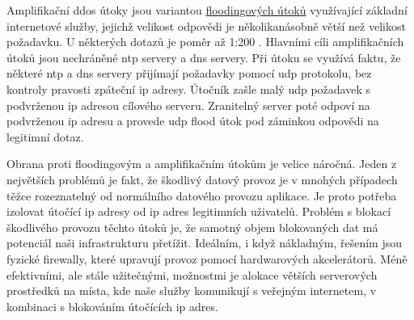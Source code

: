 
\noindent
Amplifikační \acrshort{ddos} útoky jsou variantou \hyperref[subsec:ddos-flood-attack]{floodingových útoků} využívající základní internetové služby, jejichž velikost odpovědi je několikanásobně větší než velikost požadavku. U některých dotazů je poměr až 1:200 \cite{ddos-amplify-ratio}. Hlavními cíli amplifikačních útoků jsou nechráněné \acrshort{ntp} servery\cite{ddos-amplify-ratio} a \acrshort{dns} servery\cite{dns-flood}. Při útoku se využívá faktu, že některé \acrshort{ntp} a \acrshort{dns} servery přijímají požadavky pomocí \acrshort{udp} protokolu, bez kontroly pravosti zpáteční \acrshort{ip} adresy. Útočník zašle malý \acrshort{udp} požadavek s podvrženou \acrshort{ip} adresou cílového serveru. Zranitelný server poté odpoví na podvrženou \acrshort{ip} adresu a provede \acrshort{udp} flood útok pod záminkou odpovědi na legitimní dotaz.


\noindent
Obrana proti floodingovým a amplifikačním útokům je velice náročná. Jeden z největších problémů je fakt, že škodlivý datový provoz je v mnohých případech těžce rozeznatelný od normálního datového provozu aplikace. Je proto potřeba izolovat útočící \acrshort{ip} adresy od \acrshort{ip} adres legitimních uživatelů. Problém s blokací škodlivého provozu těchto útoků je, že samotný objem blokovaných dat má potenciál naši infrastrukturu přetížit. Ideálním, i když nákladným, řešením jsou fyzické firewally, které upravují provoz pomocí hardwarových akcelerátorů. Méně efektivními, ale stále užitečnými, možnostmi je alokace větších serverových prostředků na místa, kde naše služby komunikují s veřejným internetem, v kombinaci s blokováním útočících \acrshort{ip} adres. 
